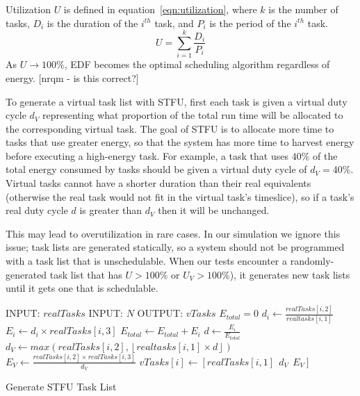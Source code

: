 Utilization $U$ is defined in equation~\ref{eqn:utilization}, where $k$ is the number of tasks, $D_i$ is the duration of the $i^{th}$ task, and $P_i$ is the period of the $i^{th}$ task.
\begin{equation}
\label{eqn:utilization}
U = \sum_{i=1}^{k} \frac{D_i}{P_i}
\end{equation}
As $U \to 100\%$, EDF becomes the optimal scheduling algorithm regardless of energy. [nrqm - is this correct?]

To generate a virtual task list with \textsc{STFU}, first each task is given a virtual duty cycle $d_V$ representing what proportion of the total run time will be allocated to the corresponding virtual task.  The goal of \textsc{STFU} is to allocate more time to tasks that use greater energy, so that the system has more time to harvest energy before executing a high-energy task.  For example, a task that uses $40\%$ of the total energy consumed by tasks should be given a virtual duty cycle of $d_V=40\%$.  Virtual tasks cannot have a shorter duration than their real equivalents (otherwise the real task would not fit in the virtual task's timeslice), so if a task's real duty cycle $d$ is greater than $d_V$ then it will be unchanged.

This may lead to overutilization in rare cases.  In our simulation we ignore this issue; task lists are generated statically, so a system should not be programmed with a task list that is unschedulable.  When our tests encounter a randomly-generated task list that has $U > 100\%$ or $U_V > 100\%$), it generates new task lists until it gets one that is schedulable.
\begin{algorithm}[htb]
\label{alg:stfualg}
\begin{algorithmic}
\STATE INPUT: $realTasks$  
\STATE INPUT: $N$ 
\STATE OUTPUT: $vTasks$ 
\STATE $E_{total} = 0$
\STATE $d_i \gets \frac{realTasks[i, 2]}{realtasks[i,1]}$
\STATE $E_i \gets d_i \times realTasks[i,3]$
\STATE $E_{total} \gets E_{total} + E_i$
\ENDFOR
{}
\STATE $d \gets \frac{E_i}{E_{total}}$
\STATE $d_{V} \gets max(realTasks[i, 2], \left \lfloor realtasks[i, 1] \times d \right \rfloor)$
\STATE $E_V \gets \frac{realTasks[i,2]\times realTasks[i,3]}{d_{V}}$
\STATE $vTasks[i] \gets [realTasks[i,1]~~d_{V}~~E_V]$
\ENDFOR
\end{algorithmic}
\caption{Generate \textsc{STFU} Task List}
\end{algorithm}

